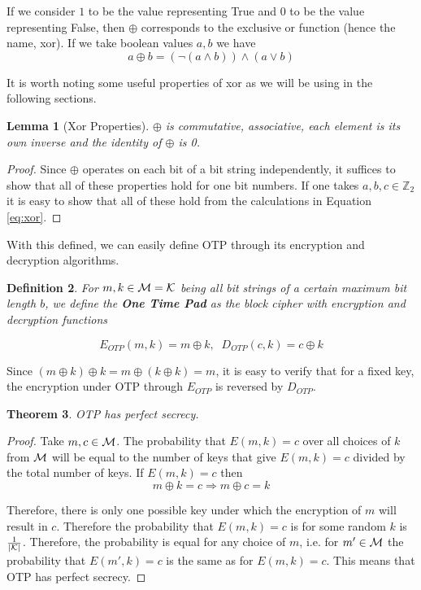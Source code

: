 \documentclass[12pt,a4paper]{article}
\newtheorem{theorem}{Theorem}
\newtheorem{definition}[theorem]{Definition}
\newtheorem{lemma}[theorem]{Lemma}
\begin{document}
If we consider $1$ to be the value representing True and $0$ to be the value
representing False, then $\oplus$ corresponds to the exclusive or function
(hence the name, xor). If we take boolean values $a,b$ we have
\[a \oplus b = (\neg (a \wedge b)) \wedge (a \vee b)\]

It is worth noting some useful properties of xor as we will be using 
in the following sections.

\begin{lemma}[Xor Properties]
$\oplus$ is commutative, associative, each element is its own inverse and
the identity of $\oplus$ is 0.
\end{lemma}
\begin{proof}
Since $\oplus$ operates on each bit of a bit string independently, it suffices
to show that all of these properties hold for one bit numbers. If one takes
$a,b,c \in \mathbb{Z}_2$ it is easy to show that all of these hold from the
calculations in Equation \ref{eq:xor}.
\end{proof}

With this defined, we can easily define OTP through its encryption and
decryption algorithms.

\begin{definition}
For $m,k \in {\cal{M}}={\cal{K}}$ being all bit strings of a certain maximum
bit length $b$, we define the \textbf{One Time Pad} as the block cipher
with encryption and decryption functions

\[E_{OTP}(m,k) = m \oplus k, \;\; D_{OTP}(c,k) = c \oplus k \]
\end{definition}

Since $(m \oplus k) \oplus k = m \oplus (k \oplus k) = m$, it is easy to verify
that for a fixed key, the encryption under OTP through $E_{OTP}$ is reversed by
$D_{OTP}$.

\begin{theorem}
\label{thm:OTP}
OTP has perfect secrecy.
\end{theorem}
\begin{proof}
Take $m,c \in \cal{M}$. The probability that $E(m,k) = c$ over all choices of
$k$ from $\cal{M}$ will be equal to the
number of keys that give $E(m,k) = c$ divided by the total number of keys. If
$E(m,k)=c$ then \[m \oplus k = c \Rightarrow m \oplus c = k \]

Therefore, there is only one possible key under which the encryption of $m$
will result in $c$. Therefore the probability that $E(m,k) = c$
is for some random $k$ is $\frac{1}{|\cal{K}|}$. Therefore, the probability is
equal for any choice of $m$, i.e. for $m' \in \cal{M}$ the probability that
$E(m',k)=c$ is the same as for $E(m,k)=c$. This means that OTP has perfect
secrecy.
\end{proof}
\end{document}
